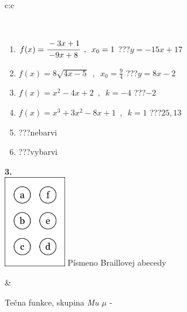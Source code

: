 \documentclass[10pt]{report}
\begin{document}
\begin{tabular}{c:c}
\begin{minipage}[c][104.5mm][t]{0.5\linewidth}
\begin{center}
\begin{minipage}{0.95\linewidth}
\begin{center}
\end{center}
\end{minipage}
\\[1mm]
\begin{minipage}{0.79\linewidth}
\begin{center}
\begin{varwidth}{\linewidth}
\begin{enumerate}
\small
\item $f(x)=\cfrac{-3x+1}{-9x+8}\enspace , \enspace x_0=1$\quad \dotfill\; ???\;\dotfill \quad $y = -15x+17$
\item $f(x)=8\sqrt{4x-5}\enspace , \enspace x_0=\frac{9}{4}$\quad \dotfill\; ???\;\dotfill \quad $y = 8x-2$
\item $f(x)=x^2-4x+2\enspace , \enspace k=-4$\quad \dotfill\; ???\;\dotfill \quad $-2$
\item $f(x)=x^3+3x^2-8x+1\enspace , \enspace k=1$\quad \dotfill\; ???\;\dotfill \quad $25 , 13$
\item \quad \dotfill\; ???\;\dotfill \quad nebarvi
\item \quad \dotfill\; ???\;\dotfill \quad vybarvi
\end{enumerate}
\end{varwidth}
\end{center}
\end{minipage}
\begin{minipage}{0.20\linewidth}
\begin{center}
{\Huge\bfseries 3.} \\[2mm]
\includegraphics[height=40mm]{../images/braille.png}
{\small Písmeno Braillovej abecedy}
\end{center}
\end{minipage}
\end{center}
\end{minipage}
&
\begin{minipage}[c][104.5mm][t]{0.5\linewidth}
\begin{center}
\vspace{7mm}
{\huge Tečna funkce, skupina \textit{Mu $\mu$} -}\\[5mm]

\end{center}
\end{minipage}
\end{tabular}
\end{document}
